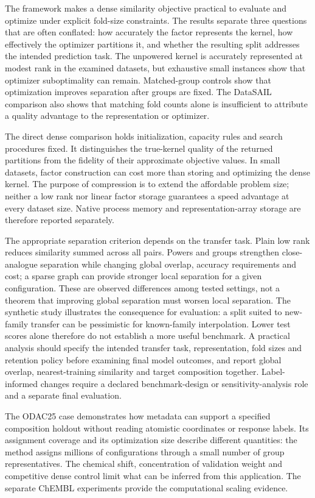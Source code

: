 \documentclass[12pt]{article}
\begin{document}
The framework makes a dense similarity objective practical to evaluate and
optimize under explicit fold-size constraints. The results separate three
questions that are often conflated: how accurately the factor represents the
kernel, how effectively the optimizer partitions it, and whether the resulting
split addresses the intended prediction task. The unpowered kernel is
accurately represented at modest rank in the examined datasets, but exhaustive
small instances show that optimizer suboptimality can remain. Matched-group
controls show that optimization improves separation after groups are fixed. The
DataSAIL comparison also shows that matching fold counts alone is insufficient
to attribute a quality advantage to the representation or optimizer.

The direct dense comparison holds initialization, capacity rules and search
procedures fixed. It distinguishes the true-kernel quality of the returned
partitions from the fidelity of their approximate objective values. In small
datasets, factor construction can cost more than storing and optimizing the
dense kernel. The purpose of compression is to extend the affordable problem
size; neither a low rank nor linear factor storage guarantees a speed advantage
at every dataset size. Native process memory and representation-array storage
are therefore reported separately.

The appropriate separation criterion depends on the transfer task. Plain low
rank reduces similarity summed across all pairs. Powers and groups strengthen
close-analogue separation while changing global overlap, accuracy requirements
and cost; a sparse graph can provide stronger local separation for a given
configuration. These are observed differences among tested settings, not a
theorem that improving global separation must worsen local separation. The
synthetic study illustrates the consequence for evaluation:
a split suited to new-family transfer can be pessimistic for known-family
interpolation. Lower test scores alone therefore do not establish a more useful
benchmark. A practical analysis should specify the intended transfer task,
representation, fold sizes and retention policy before examining final model
outcomes, and report global overlap, nearest-training similarity and target
composition together. Label-informed changes require a declared
benchmark-design or sensitivity-analysis role and a separate final evaluation.

The ODAC25 case demonstrates how metadata can support a specified composition
holdout without reading atomistic coordinates or response labels. Its
assignment coverage and its optimization size describe different quantities:
the method assigns millions of configurations through a small number of group
representatives. The chemical shift, concentration of validation weight and
competitive dense control limit what can be inferred from this application. The
separate ChEMBL experiments provide the computational scaling evidence.
\end{document}
